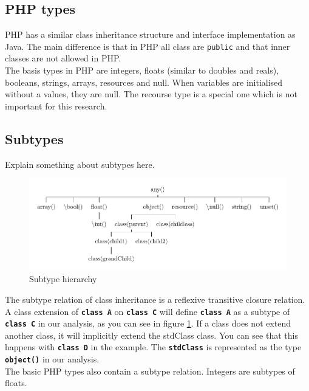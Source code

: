 \documentclass[../main.tex]{subfiles}
\begin{document}
    \subsection{PHP types}
    PHP has a similar class inheritance structure and interface implementation as Java.
    The main difference is that in PHP all class are \texttt{public} and that inner classes are not allowed in PHP. 
    \\
    The basis types in PHP are integers, floats (similar to doubles and reals), booleans, strings, arrays, resources and null.
    When variables are initialised without a values, they are null. The recourse type is a special one which is not important for this research.
 
    \subsection{Subtypes}
    
    Explain something about subtypes here.

    
    \begin{figure}[H]
        \includegraphics{Diagrams/Subtypes.pdf}
        \caption{Subtype hierarchy}
        \label{fig:subtypes}
    \end{figure}

    The subtype relation of class inheritance is a \gls{reflexive transitive closure} relation.
    A class extension of \textbf{\texttt{class A}} on \textbf{\texttt{class C}} will define \textbf{\texttt{class A}} as a subtype of \textbf{\texttt{class C}} in our analysis, as you can see in figure \ref{fig:subtypes}.
    If a class does not extend another class, it will implicitly extend the \gls{stdClass} class.
    You can see that this happens with \textbf{\texttt{class D}} in the example.
    The \textbf{\texttt{stdClass}} is represented as the type \textbf{\texttt{object()}} in our analysis.
    \\
    The basic PHP types also contain a subtype relation.
    Integers are subtypes of floats.
 
\end{document}
